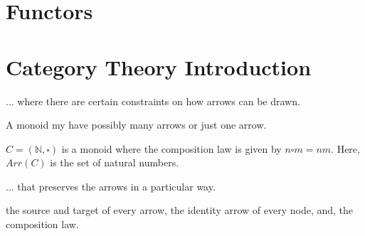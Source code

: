 \section{Functors}



\section{Category Theory Introduction}


... where there are certain constraints on how arrows can be drawn.


A monoid my have possibly many arrows or just one arrow. 

\begin{example}
$C = (\mathbb{N}, \square)$ is a monoid where the composition law is given by $n \square m = nm$.
Here, $Arr(C)$ is the set of natural numbers. 

\end{example}


... that preserves the arrows in a particular way. 

the source and target of every arrow, the identity arrow of every node, 
and, the composition law.


